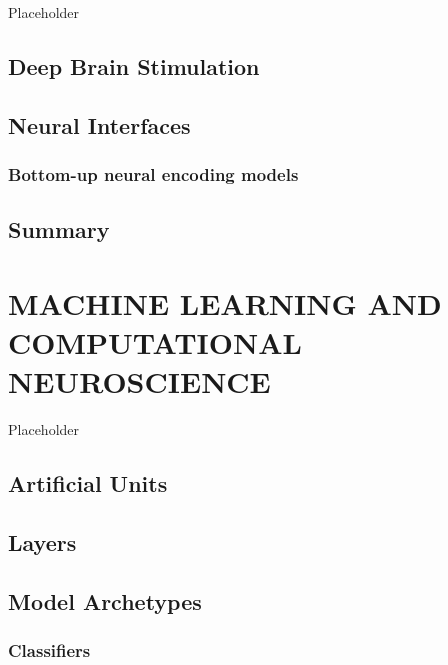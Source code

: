 \documentclass{templates/ucdenverthesis}
\begin{document}
Placeholder

\hypertarget{sec:dbs}{%
\section{Deep Brain Stimulation}\label{sec:dbs}}

\hypertarget{sec:neuralinterfaces}{%
\section{Neural Interfaces}\label{sec:neuralinterfaces}}

\hypertarget{bottom-up-neural-encoding-models}{%
\subsection{Bottom-up neural encoding models}\label{bottom-up-neural-encoding-models}}

\hypertarget{sec:ch1summary}{%
\section{Summary}\label{sec:ch1summary}}

\hypertarget{ch:mlprimer}{%
\chapter{MACHINE LEARNING AND COMPUTATIONAL NEUROSCIENCE}\label{ch:mlprimer}}

Placeholder

\hypertarget{sec:artificialunits}{%
\section{Artificial Units}\label{sec:artificialunits}}

\hypertarget{sec:layers}{%
\section{Layers}\label{sec:layers}}

\hypertarget{sec:modarchetypes}{%
\section{Model Archetypes}\label{sec:modarchetypes}}

\hypertarget{sec:classifiers}{%
\subsection{Classifiers}\label{sec:classifiers}}
\end{document}
